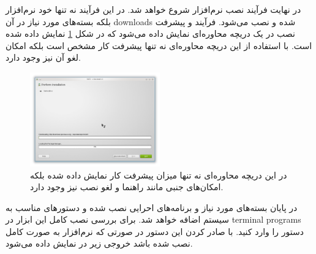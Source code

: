 در نهایت فرآیند نصب نرم‌افزار شروع خواهد شد. در این فرآیند نه تنها خود نرم‌افزار
بلکه بسته‌های مورد نیاز در آن \glspl{download} شده و نصب می‌شود. فرآیند و پیشرفت
نصب در یک دریچه محاوره‌ای نمایش داده می‌شود که در شکل
\ref{image/write/graph/mscgen/install-OpenSuse-6} نمایش داده شده است. با
استفاده از این دریچه محاوره‌ای نه تنها پیشرفت کار مشخص است بلکه امکان لغو آن نیز وجود دارد.

\begin{figure}
	\centering
	\includegraphics[width=0.5\textwidth]{image/write/graph/mscgen/install-OpenSuse-6}
	\caption[فرآیند نصب نرم‌افزار ]{
		در این دریچه محاوره‌ای نه تنها میزان پیشرفت کار نمایش داده شده بلکه امکان‌های
		جنبی مانند راهنما و لغو نصب نیز وجود دارد.
	}
	\label{image/write/graph/mscgen/install-OpenSuse-6}
\end{figure}

در پایان بسته‌های مورد نیاز و برنامه‌های احرایی نصب شده و دستورهای مناسب به
سیستم اضافه خواهد شد. برای بررسی نصب کامل این ابزار در \glspl{terminal program} دستور
 را وارد کنید. با صادر کردن این دستور در صورتی که نرم‌افزار به صورت
کامل نصب شده باشد خروجی زیر در  نمایش داده می‌شود.

